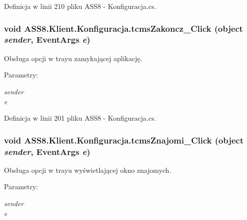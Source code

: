 Definicja w linii 210 pliku ASS8 - Konfiguracja.cs.\hypertarget{a00014_2f9d0525ac9851488072e040aaf7651c}{
\subsubsection[{tcmsZakoncz\_\-Click}]{\setlength{\rightskip}{0pt plus 5cm}void ASS8.Klient.Konfiguracja.tcmsZakoncz\_\-Click (object {\em sender}, \/  EventArgs {\em e})}}
\label{d2/de7/a00014_2f9d0525ac9851488072e040aaf7651c}


Obsługa opcji w trayu zamykającej aplikację. 

\begin{Desc}
\item[Parametry:]
\begin{description}
\item[{\em sender}]\item[{\em e}]\end{description}
\end{Desc}


Definicja w linii 201 pliku ASS8 - Konfiguracja.cs.\hypertarget{a00014_e273925aef74f02490b3a4ac6af6b779}{
\subsubsection[{tcmsZnajomi\_\-Click}]{\setlength{\rightskip}{0pt plus 5cm}void ASS8.Klient.Konfiguracja.tcmsZnajomi\_\-Click (object {\em sender}, \/  EventArgs {\em e})}}
\label{d2/de7/a00014_e273925aef74f02490b3a4ac6af6b779}


Obsługa opcji w trayu wyświetlającej okno znajomych. 

\begin{Desc}
\item[Parametry:]
\begin{description}
\item[{\em sender}]\item[{\em e}]\end{description}
\end{Desc}


